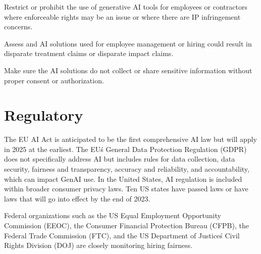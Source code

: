\begin{minipage}{\linewidth}
\begin{checklist}
  \item Restrict or prohibit the use of generative AI tools for employees or contractors where enforceable rights may be an issue or where there are IP infringement concerns.
  \item Assess and AI solutions used for employee management or hiring could result in disparate treatment claims or disparate impact claims.
  \item Make sure the AI solutions do not collect or share sensitive information without proper consent or authorization.
\end{checklist}
\end{minipage}

\section{Regulatory}
The EU AI Act is anticipated to be the first comprehensive AI law but will
apply in 2025 at the earliest. The EU\'s General Data Protection Regulation
(GDPR) does not specifically address AI but includes rules for data collection,
data security, fairness and transparency, accuracy and reliability, and
accountability, which can impact GenAI use. In the United States, AI regulation
is included within broader consumer privacy laws. Ten US states have passed
laws or have laws that will go into effect by the end of 2023.

Federal organizations such as the US Equal Employment Opportunity Commission
(EEOC), the Consumer Financial Protection Bureau (CFPB), the Federal Trade
Commission (FTC), and the US Department of Justice\'s Civil Rights Division
(DOJ) are closely monitoring hiring fairness.

